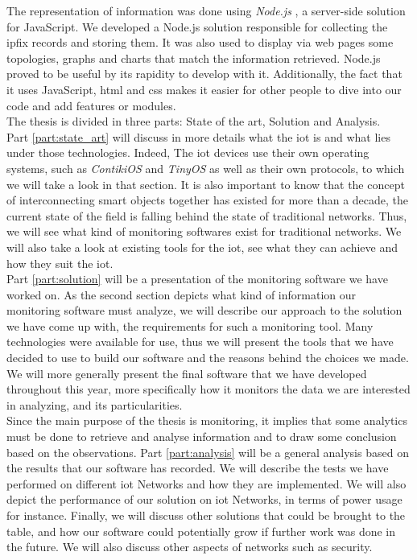 The representation of information was done using \textit{Node.js} \cite{website:nodejs}, a server-side solution for JavaScript. We developed a Node.js solution responsible for collecting the \acrshort{ipfix} records and storing them. It was also used to display via web pages some topologies, graphs and charts that match the information retrieved. Node.js proved to be useful by its rapidity to develop with it. Additionally, the fact that it uses JavaScript, \acrshort{html} and \acrshort{css} makes it easier for other people to dive into our code and add features or modules. \\

The thesis is divided in three parts: State of the art, Solution and Analysis.\\

Part \ref{part:state_art} will discuss in more details what the \acrlong{iot} is and what lies under those technologies. Indeed, The \acrshort{iot} devices use their own operating systems, such as \textit{ContikiOS} and \textit{TinyOS} as well as their own protocols, to which we will take a look in that section. It is also important to know that the concept of interconnecting smart objects together has existed for more than a decade, the current state of the field is falling behind the state of traditional networks. Thus, we will see what kind of monitoring softwares exist for traditional networks. We will also take a look at existing tools for the \acrshort{iot}, see what they can achieve and how they suit the \acrshort{iot}.\\

Part \ref{part:solution} will be a presentation of the monitoring software we have worked on. As the second section depicts what kind of information our monitoring software must analyze, we will describe our approach to the solution we have come up with, the requirements for such a monitoring tool. Many technologies were available for use, thus we will present the tools that we have decided to use to build our software and the reasons behind the choices we made. We will more generally present the final software that we have developed throughout this year, more specifically how it monitors the data we are interested in analyzing, and its particularities. \\

Since the main purpose of the thesis is monitoring, it implies that some analytics must be done to retrieve and analyse information and to draw some conclusion based on the observations. Part \ref{part:analysis} will be a general analysis based on the results that our software has recorded. We will describe the tests we have performed on different \acrshort{iot} Networks and how they are implemented. We will also depict the performance of our solution on \acrshort{iot} Networks, in terms of power usage for instance. Finally, we will discuss other solutions that could be brought to the table, and how our software could potentially grow if further work was done in the future. We will also discuss other aspects of networks such as security.
